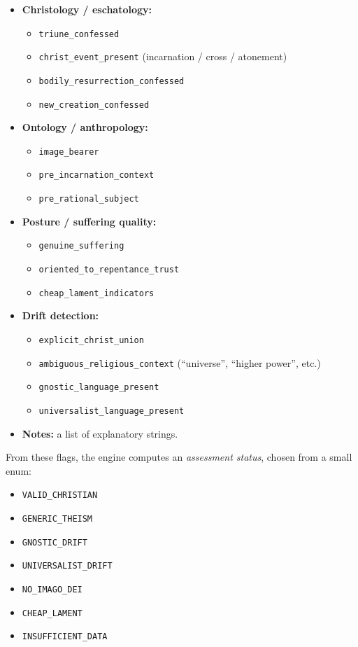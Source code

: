 \documentclass[11pt]{article}
\begin{document}
\begin{itemize}
  \item \textbf{Christology / eschatology:}
    \begin{itemize}
      \item \texttt{triune\_confessed}
      \item \texttt{christ\_event\_present} (incarnation / cross / atonement)
      \item \texttt{bodily\_resurrection\_confessed}
      \item \texttt{new\_creation\_confessed}
    \end{itemize}
  \item \textbf{Ontology / anthropology:}
    \begin{itemize}
      \item \texttt{image\_bearer}
      \item \texttt{pre\_incarnation\_context}
      \item \texttt{pre\_rational\_subject}
    \end{itemize}
  \item \textbf{Posture / suffering quality:}
    \begin{itemize}
      \item \texttt{genuine\_suffering}
      \item \texttt{oriented\_to\_repentance\_trust}
      \item \texttt{cheap\_lament\_indicators}
    \end{itemize}
  \item \textbf{Drift detection:}
    \begin{itemize}
      \item \texttt{explicit\_christ\_union}
      \item \texttt{ambiguous\_religious\_context} (``universe'', ``higher power'', etc.)
      \item \texttt{gnostic\_language\_present}
      \item \texttt{universalist\_language\_present}
    \end{itemize}
  \item \textbf{Notes:} a list of explanatory strings.
\end{itemize}

From these flags, the engine computes an \emph{assessment status}, chosen from a small enum:

\begin{itemize}
  \item \texttt{VALID\_CHRISTIAN}
  \item \texttt{GENERIC\_THEISM}
  \item \texttt{GNOSTIC\_DRIFT}
  \item \texttt{UNIVERSALIST\_DRIFT}
  \item \texttt{NO\_IMAGO\_DEI}
  \item \texttt{CHEAP\_LAMENT}
  \item \texttt{INSUFFICIENT\_DATA}
\end{itemize}
\end{document}
